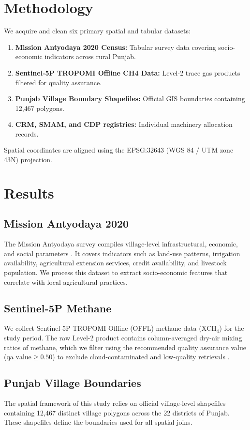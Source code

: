 \documentclass[12pt,a4paper]{report}
\begin{document}
\section{Methodology}
We acquire and clean six primary spatial and tabular datasets:
\begin{enumerate}
    \item \textbf{Mission Antyodaya 2020 Census:} Tabular survey data covering socio-economic indicators across rural Punjab.
    \item \textbf{Sentinel-5P TROPOMI Offline CH4 Data:} Level-2 trace gas products filtered for quality assurance.
    \item \textbf{Punjab Village Boundary Shapefiles:} Official GIS boundaries containing 12,467 polygons.
    \item \textbf{CRM, SMAM, and CDP registries:} Individual machinery allocation records.
\end{enumerate}
Spatial coordinates are aligned using the EPSG:32643 (WGS 84 / UTM zone 43N) projection.

\section{Results}
\subsection{Mission Antyodaya 2020}
The Mission Antyodaya survey compiles village-level infrastructural, economic, and social parameters \citep{missionantyodaya2020}. It covers indicators such as land-use patterns, irrigation availability, agricultural extension services, credit availability, and livestock population. We process this dataset to extract socio-economic features that correlate with local agricultural practices.

\subsection{Sentinel-5P Methane}
We collect Sentinel-5P TROPOMI Offline (OFFL) methane data ($\text{XCH}_4$) for the study period. The raw Level-2 product contains column-averaged dry-air mixing ratios of methane, which we filter using the recommended quality assurance value ($\text{qa\_value} \ge 0.50$) to exclude cloud-contaminated and low-quality retrievals \citep{loyola2018tropy}.

\subsection{Punjab Village Boundaries}
The spatial framework of this study relies on official village-level shapefiles containing 12,467 distinct village polygons across the 22 districts of Punjab. These shapefiles define the boundaries used for all spatial joins.
\end{document}
